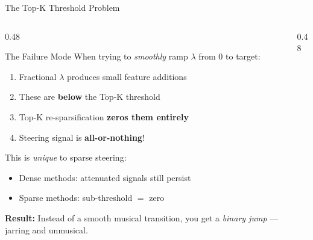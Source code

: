 \documentclass[aspectratio=169, 11pt]{beamer}
\begin{document}
\begin{frame}{The Top-K Threshold Problem}

\begin{columns}[T]
\begin{column}{0.48\textwidth}
\begin{alertblock}{The Failure Mode}
When trying to \emph{smoothly} ramp $\lambda$ from 0 to target:
\begin{enumerate}
  \item Fractional $\lambda$ produces small feature additions
  \item These are \textbf{below} the Top-K threshold
  \item Top-K re-sparsification \textbf{zeros them entirely}
  \item Steering signal is \textbf{all-or-nothing}!
\end{enumerate}
\end{alertblock}

\vspace{0.3em}
This is \emph{unique} to sparse steering:
\begin{itemize}
  \item Dense methods: attenuated signals still persist
  \item Sparse methods: sub-threshold $=$ zero
\end{itemize}

\vspace{0.3em}
\textbf{Result:} Instead of a smooth musical transition, you get a \emph{binary jump} --- jarring and unmusical.
\end{column}

\begin{column}{0.48\textwidth}
\begin{center}
\end{center}


\end{column}
\end{columns}
\end{frame}
\end{document}
